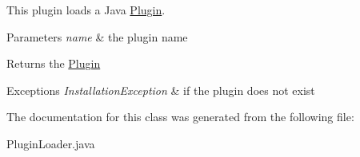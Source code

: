 This plugin loads a Java \hyperlink{interfaceorg_1_1libelektra_1_1Plugin}{Plugin}. 


\begin{DoxyParams}{Parameters}
{\em name} & the plugin name \\
\hline
\end{DoxyParams}
\begin{DoxyReturn}{Returns}
the \hyperlink{interfaceorg_1_1libelektra_1_1Plugin}{Plugin} 
\end{DoxyReturn}

\begin{DoxyExceptions}{Exceptions}
{\em Installation\+Exception} & if the plugin does not exist \\
\hline
\end{DoxyExceptions}


The documentation for this class was generated from the following file\+:\begin{DoxyCompactItemize}
\item 
Plugin\+Loader.\+java\end{DoxyCompactItemize}
